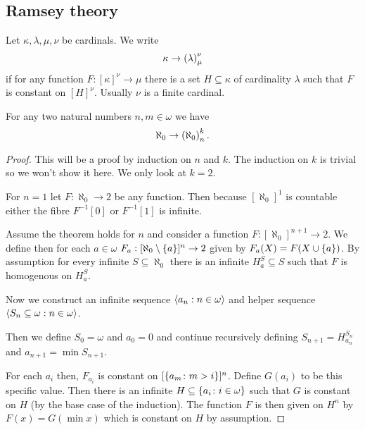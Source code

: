 \subsection{Ramsey theory}

\begin{definition}
    Let \(\kappa,\lambda,\mu,\nu\) be cardinals. We write
    \[
        \kappa\to\left(\lambda\right)_{\mu}^{\nu}
    \]
    if for any function \(F:[\kappa]^{\nu}\to\mu\) there is a set
    \(H\subseteq\kappa\) of cardinality \(\lambda\) such that \(F\) is constant
    on \([H]^{\nu}\). Usually \(\nu\) is a finite cardinal.
\end{definition}

\begin{proposition}
    For any two natural numbers \(n,m\in\omega\) we have
    \[
        \aleph_{0}\to\left(\aleph_{0}\right)_{n}^{k}.
    \]

    \begin{proof}
        This will be a proof by induction on \(n\) and \(k\). The induction on
        \(k\) is trivial so we won't show it here. We only look at \(k=2\).

        For \(n=1\) let \(F:\aleph_{0}\to 2\) be any function. Then because
        \([\aleph_{0}]^{1}\) is countable either the fibre \(F^{-1}[0]\) or
        \(F^{-1}[1]\) is infinite.

        Assume the theorem holds for \(n\) and consider a function
        \(F:[\aleph_{0}]^{n+1}\to 2\). We define then for each \(a\in\omega\)
        \(F_{a}:[\aleph_{0}\setminus\left\{a\right\}]^{n}\to 2\) given by
        \(F_{a}(X)=F(X\cup\left\{a\right\})\). By assumption for every infinite
        \(S\subseteq\aleph_{0}\) there is an infinite \(H^{S}_{a}\subseteq S\)
        such that \(F\) is homogenous on \(H^{S}_{a}\).

        Now we construct an infinite sequence \(\left<a_{n}:n\in\omega\right>\)
        and helper sequence \(\left<S_{n}\subseteq\omega:n\in\omega\right>\).

        Then we define \(S_{0}=\omega\) and \(a_{0}=0\) and continue recursively
        defining \(S_{n+1}=H^{S_{n}}_{a_{n}}\) and \(a_{n+1}=\min S_{n+1}\).

        For each \(a_{i}\) then, \(F_{a_{i}}\) is constant on
        \([\left\{a_{m}\colon m>i\right\}]^{n}\). Define \(G(a_{i})\) to be this specific
        value. Then there is an infinite
        \(H\subseteq\left\{a_{i}\colon i\in\omega\right\}\) such that \(G\) is constant on
        \(H\) (by the base case of the induction). The function \(F\) is then
        given on \(H^{n}\) by \(F(x)=G(\min x)\) which is constant on \(H\)
        by assumption.
    \end{proof}
\end{proposition}


